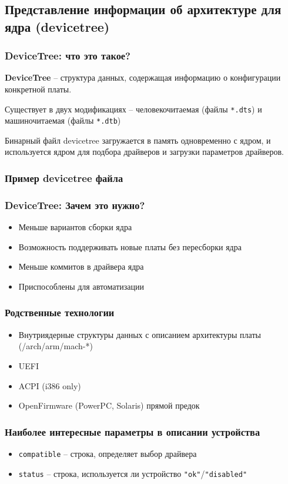 \subsection{Представление информации об архитектуре для ядра (devicetree)}
\begin{frame}
  \frametitle{DeviceTree: что это такое?}
\textbf{DeviceTree} -- структура данных, содержащая информацию о конфигурации конкретной платы. 

\vspace{1cm}

Существует в двух модификациях -- человекочитаемая (файлы \texttt{*.dts}) и машиночитаемая (файлы \texttt{*.dtb})

\vspace{1cm}

Бинарный файл devicetree загружается в память одновременно с ядром, и используется ядром для подбора драйверов и загрузки параметров драйверов.
\end{frame}

\begin{frame}
  \frametitle{Пример devicetree файла}
\end{frame}

\begin{frame}
  \frametitle{DeviceTree: Зачем это нужно?}
  \begin{itemize}
     \item Меньше вариантов сборки ядра
     \item Возможность поддерживать новые платы без пересборки ядра
     \item Меньше коммитов в драйвера ядра 
     \item Приспособлены для автоматизации
  \end{itemize}
\end{frame}
\begin{frame}
  \frametitle{Родственные технологии}
  \begin{itemize}
      \item Внутриядерные структуры данных с описанием архитектуры платы (/arch/arm/mach-*) 
      \item UEFI
      \item ACPI (i386 only)
      \item OpenFirmware (PowerPC, Solaris) прямой предок
  \end{itemize}
\end{frame}

\begin{frame}
  \frametitle{Наиболее интересные параметры в описании устройства}
  \begin{itemize}
    \item \texttt{compatible} -- строка, определяет выбор драйвера
    \item \texttt{status} -- строка, используется ли устройство \texttt{"ok"}/\texttt{"disabled"}
  \end{itemize}
\end{frame}

